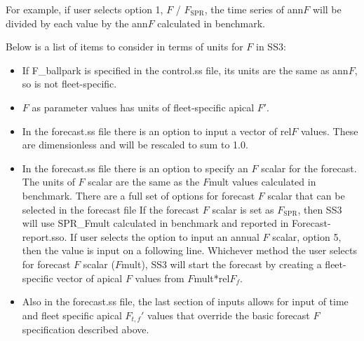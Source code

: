 For example, if user selects option 1, $F$ / $F_\text{SPR}$, the time series of ann$F$ will be divided by each value by the ann$F$ calculated in benchmark.

Below is a list of items to consider in terms of units for $F$ in SS3:
\begin{itemize}
	\item If F\_ballpark is specified in the control.ss file, its units are the same as ann$F$, so is not fleet-specific.
	
	\item $F$ as parameter values has units of fleet-specific apical $F'$.
	
	\item In the forecast.ss file there is an option to input a vector of rel$F$ values. These are dimensionless and will be rescaled to sum to 1.0.
	
	\item In the forecast.ss file there is an option to specify an $F$ scalar for the forecast.  The units of $F$ scalar are the same as the $F$mult values calculated in benchmark.  There are a full set of options for forecast $F$ scalar that can be selected in the forecast file 
	If the forecast $F$ scalar is set as $F_\text{SPR}$, then SS3 will use SPR\_Fmult calculated in benchmark and reported in Forecast-report.sso.  If user selects the option to input an annual $F$ scalar, option 5, then the value is input on a following line.  Whichever method the user selects for forecast $F$ scalar ($F$mult), SS3 will start the forecast by creating a fleet-specific vector of apical $F$ values from $F$mult*rel$F_f$.
	
	\item Also in the forecast.ss file, the last section of inputs allows for input of time and fleet specific apical $F_{t,f}'$ values that override the basic forecast $F$ specification described above.
\end{itemize}